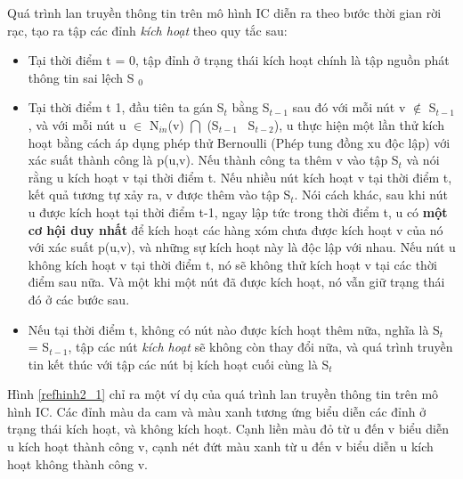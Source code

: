 	Quá trình lan truyền thông tin trên mô hình IC diễn ra theo bước thời gian rời rạc, tạo ra tập các đỉnh {\itshape kích hoạt} theo quy tắc sau:
	\begin {itemize}
		\item Tại thời điểm t = 0, tập đỉnh ở trạng thái kích hoạt chính là tập nguồn phát thông tin sai lệch S $_{0}$
	
		\item Tại thời điểm t  1, đầu tiên ta gán S$_{t}$ bằng S$_{t-1}$ sau đó với mỗi nút v $\notin$ S$_{t-1}$, và với mỗi nút u $\in$ N$_{in}$(v) $\bigcap$ (S$_{t-1}$ \ S$_{t-2}$), u thực hiện một lần thử kích hoạt bằng cách áp dụng phép thử Bernoulli (Phép tung đồng xu độc lập) với xác suất thành công là p(u,v). Nếu thành công ta thêm v vào tập S$_{t}$ và nói rằng u kích hoạt v tại thời điểm t. Nếu nhiều nút kích hoạt v tại thời điểm t, kết quả tương tự xảy ra, v được thêm vào tập S$_{t}$. Nói cách khác, sau khi nút u được kích hoạt tại thời điểm t-1, ngay lập tức trong thời điểm t, u có {\bfseries một cơ hội duy nhất} để kích hoạt các hàng xóm chưa được kích hoạt v của nó với xác suất p(u,v), và những sự kích hoạt này là độc lập với nhau. Nếu nút u không kích hoạt v tại thời điểm t, nó sẽ không thử kích hoạt v tại các thời điểm sau nữa. Và một khi một nút đã được kích hoạt, nó vẫn giữ trạng thái đó ở các bước sau.
		
		\item Nếu tại thời điểm t, không có nút nào được kích hoạt thêm nữa, nghĩa là S$_{t}$ = S$_{t-1}$, tập các nút {\itshape kích hoạt} sẽ không còn thay đổi nữa, và quá trình truyền tin kết thúc với tập các nút bị kích hoạt cuối cùng là S$_{t}$
	\end {itemize}
	Hình \ref{refhinh2_1} chỉ ra một ví dụ của quá trình lan truyền thông tin trên mô hình IC. Các đỉnh màu da cam và màu xanh tương ứng biểu diễn các đỉnh ở trạng thái kích hoạt, và không kích hoạt. Cạnh liền màu đỏ từ u đến v biểu diễn u kích hoạt thành công v, cạnh nét đứt màu xanh từ u đến v biểu diễn u kích hoạt không thành công v.
